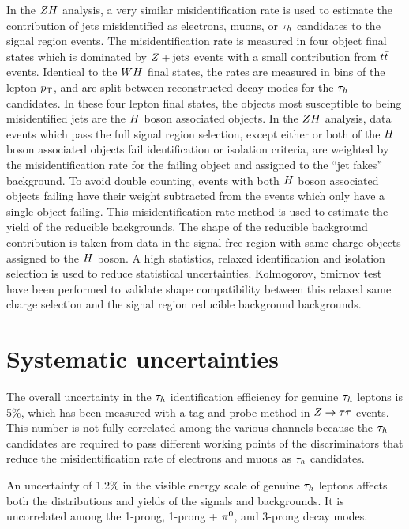 In the $ZH$ analysis, a very similar misidentification rate is used
to estimate the contribution of jets misidentified as electrons, muons, or $\tau_{h}$
candidates to the signal region events. The misidentification rate is measured in four object final states which
is dominated by $Z+\textrm{jets}$ events with a small contribution from 
$t\bar{t}$ events. Identical to the $WH$ final states, the rates are measured 
in bins of the lepton $p_\mathrm{T}$, and are split between reconstructed decay modes for 
the $\tau_{h}$ candidates. 
In these four lepton final states, the objects most susceptible 
to being misidentified jets are the $H$ boson associated objects.
In the $ZH$ analysis, data events which pass the full
signal region selection, except either or both of the $H$ boson associated objects
fail identification or isolation criteria, are weighted by the misidentification
rate for the failing object and assigned to the ``jet fakes'' background.
To avoid double counting, events with both $H$ boson associated objects failing have their weight
subtracted from the events which only have a single object failing. 
This misidentification rate method is used to estimate the yield of the reducible
backgrounds. The shape of the reducible background contribution is taken from
data in the signal free region with same charge objects assigned to the $H$ boson.
A high statistics, relaxed identification and isolation selection is used to reduce
statistical uncertainties. Kolmogorov, Smirnov test have been performed to validate
shape compatibility between this relaxed same charge selection and the signal region
reducible background backgrounds.



\section{Systematic uncertainties}
\label{sec:systematics}

The overall uncertainty in the $\tau_{h}$ identification efficiency for genuine $\tau_{h}$ 
leptons is 5\%, which has been measured with a tag-and-probe method in $Z\to\tau\tau$ events.
This number is not fully correlated among the various channels because the $\tau_{h}$ 
candidates are required to pass different working points of the discriminators that 
reduce the misidentification rate of electrons and muons as $\tau_{h}$ candidates.

An uncertainty of 1.2\% in the visible energy scale of genuine $\tau_{h}$ leptons 
affects both the distributions and yields of the signals and backgrounds. It is 
uncorrelated among the 1-prong, 1-prong + $\pi^{0}$, and 3-prong decay modes.

